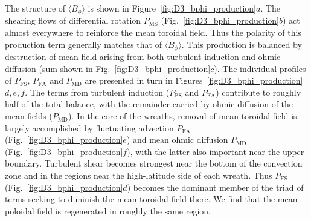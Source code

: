 The structure of $\langle B_\phi \rangle$ is shown in
Figure~\ref{fig:D3_bphi_production}$a$.  The shearing flows of
differential rotation $P_\mathrm{MS}$
(Fig.~\ref{fig:D3_bphi_production}$b$) act almost everywhere to
reinforce the mean toroidal field.  Thus the polarity of this production term
generally matches that of $\langle B_\phi \rangle$.  This production is balanced by
destruction of mean field arising from both turbulent induction and ohmic diffusion
(sum shown in Fig.~\ref{fig:D3_bphi_production}$c$).  The individual
profiles of $P_\mathrm{FS}$, $P_\mathrm{FA}$ and $P_\mathrm{MD}$ are
presented in turn in Figures~\ref{fig:D3_bphi_production}$d,e,f$.
The terms from turbulent induction ($P_\mathrm{FS}$ and
$P_\mathrm{FA}$) contribute to roughly half of the total balance, with
the remainder carried by ohmic diffusion of the mean fields
($P_\mathrm{MD}$).  In the core of the wreaths, removal of mean
toroidal field is largely accomplished
by fluctuating advection $P_\mathrm{FA}$
(Fig.~\ref{fig:D3_bphi_production}$e$) and mean ohmic diffusion
$P_\mathrm{MD}$ (Fig.~\ref{fig:D3_bphi_production}$f$), with the latter also important near the upper boundary.
Turbulent shear becomes strongest
near the bottom of the convection zone and in the
regions near the high-latitude side of each wreath.
Thus $P_\mathrm{FS}$ (Fig.~\ref{fig:D3_bphi_production}$d$) becomes the dominant member of the triad of terms
seeking to diminish the mean toroidal field there. 
We find that the mean poloidal field is regenerated in roughly the
same region.

